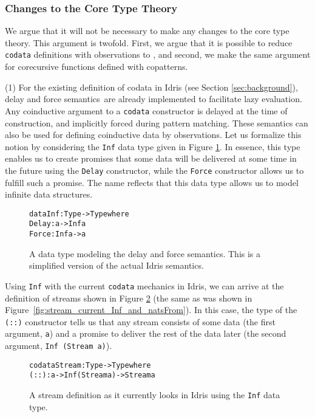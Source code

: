 \subsubsection{Changes to the Core Type Theory}
We argue that it will not be necessary to make any changes to the core type theory. This argument is twofold. First, we argue that it is possible to reduce \texttt{codata} definitions with observations to \TT, and second, we make the same argument for corecursive functions defined with copatterns.

(1) For the existing definition of codata in Idris (see Section \ref{sec:background}), delay and force semantics\,\citep[Section 3.5]{Abelson96SICP} are already implemented to facilitate lazy evaluation. Any coinductive argument to a \texttt{codata} constructor is delayed at the time of construction, and implicitly forced during pattern matching. These semantics can also be used for defining coinductive data by observations. Let us formalize this notion by considering the \texttt{Inf} data type given in Figure \ref{fig:Inf_datatype}. In essence, this type enables us to create promises that some data will be delivered at some time in the future using the \texttt{Delay} constructor, while the \texttt{Force} constructor allows us to fulfill such a promise. The name reflects that this data type allows us to model infinite data structures.

\begin{figure}
\begin{alltt}
data Inf : Type -> Type where
  Delay : a -> Inf a
  Force : Inf a -> a
\end{alltt}
\caption{A data type modeling the delay and force semantics. This is a simplified version of the actual Idris semantics.}
\label{fig:Inf_datatype}
\end{figure}

Using \texttt{Inf} with the current \texttt{codata} mechanics in Idris, we can arrive at the definition of streams shown in Figure \ref{fig:stream_current_Inf} (the same as was shown in Figure~\ref{fig:stream_current_Inf_and_natsFrom}). In this case, the type of the \texttt{(::)} constructor tells us that any stream consists of some data (the first argument, \texttt{a}) and a promise to deliver the rest of the data later (the second argument, \texttt{Inf (Stream a)}).

\begin{figure}
\begin{alltt}
codata Stream : Type -> Type where
  (::) : a -> Inf (Stream a) -> Stream a
\end{alltt}
\caption{A stream definition as it currently looks in Idris using the \texttt{Inf} data type.}
\label{fig:stream_current_Inf}
\end{figure}


